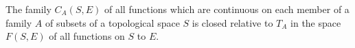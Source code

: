 The family $C_A(S, E)$ of all functions which are continuous on each member of a family $A$ of subsets of a topological space $S$ is closed relative to $T_A$ in the space $F(S, E)$ of all functions on $S$ to $E$.
